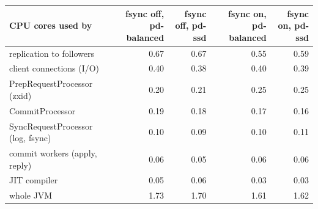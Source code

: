 \begin{tabular}{@{}lrrrr@{}}
\toprule
CPU cores used by & fsync off, pd-balanced & fsync off, pd-ssd & fsync on, pd-balanced & fsync on, pd-ssd \\
\midrule
replication to followers & 0.67 & 0.67 & 0.55 & 0.59 \\
client connections (I/O) & 0.40 & 0.38 & 0.40 & 0.39 \\
PrepRequestProcessor (zxid) & 0.20 & 0.21 & 0.25 & 0.25 \\
CommitProcessor & 0.19 & 0.18 & 0.17 & 0.16 \\
SyncRequestProcessor (log, fsync) & 0.10 & 0.09 & 0.10 & 0.11 \\
commit workers (apply, reply) & 0.06 & 0.05 & 0.06 & 0.06 \\
JIT compiler & 0.05 & 0.06 & 0.03 & 0.03 \\
whole JVM & 1.73 & 1.70 & 1.61 & 1.62 \\
\bottomrule
\end{tabular}
